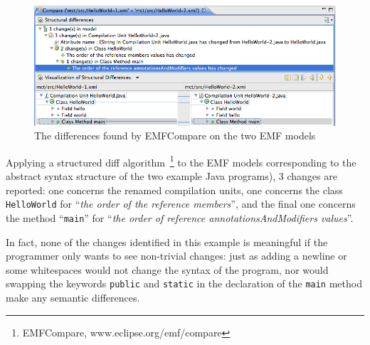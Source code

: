 \documentclass[10pt, conference, compsocconf]{IEEEtran}
\begin{document}
\begin{figure}\centering
\includegraphics[width=\columnwidth]{code/emfcompare.png}
\caption{The differences found by EMFCompare on the two EMF models}\label{fig:1}
\end{figure}
Applying a structured diff algorithm~\footnote{EMFCompare, www.eclipse.org/emf/compare} to the EMF models corresponding to the abstract syntax structure of the two example Java programs\cite{DBLP:conf/sle/HeidenreichJSW09}), 3 changes are reported: one concerns the renamed compilation units, one concerns the class {\tt HelloWorld} for ``{\em the order of the reference members}'', and the final one concerns the method ``{\tt main}'' for ``{\em the order of reference annotationsAndModifiers values}''. 

In fact, none of the changes identified in this example is meaningful if the programmer only wants to see non-trivial
changes: just as adding a newline or some whitespaces would not change the syntax of the program, nor would swapping the keywords {\tt public} and {\tt static} in the declaration of the {\tt main} method make any semantic differences.
\end{document}
